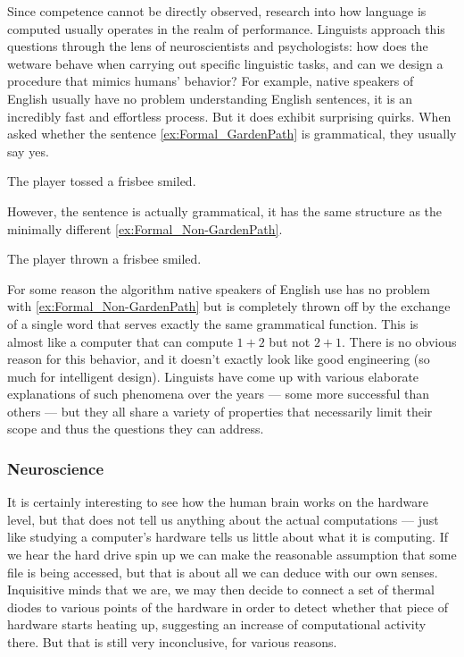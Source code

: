 Since competence cannot be directly observed, research into how language is computed usually operates in the realm of performance.
Linguists approach this questions through the lens of neuroscientists and psychologists: how does the wetware behave when carrying out specific linguistic tasks, and can we design a procedure that mimics humans' behavior?
For example, native speakers of English usually have no problem understanding English sentences, it is an incredibly fast and effortless process.
But it does exhibit surprising quirks.
When asked whether the sentence \eqref{ex:Formal_GardenPath} is grammatical, they usually say yes.
%
\begin{exe}
        \ex The player tossed a frisbee smiled.\label{ex:Formal_GardenPath}
\end{exe}
%
However, the sentence is actually grammatical, it has the same structure as the minimally different \eqref{ex:Formal_Non-GardenPath}. 
%
\begin{exe}
    \ex The player thrown a frisbee smiled.\label{ex:Formal_Non-GardenPath}
\end{exe}
%
For some reason the algorithm native speakers of English use has no problem with \eqref{ex:Formal_Non-GardenPath} but is completely thrown off by the exchange of a single word that serves exactly the same grammatical function.
This is almost like a computer that can compute $1 + 2$ but not $2 + 1$.
There is no obvious reason for this behavior, and it doesn't exactly look like good engineering (so much for intelligent design).
Linguists have come up with various elaborate explanations of such phenomena over the years --- some more successful than others ---
but they all share a variety of properties that necessarily limit their scope and thus the questions they can address.

\subsubsection{Neuroscience}

It is certainly interesting to see how the human brain works on the hardware level, but that does not tell us anything about the actual computations --- just like studying a computer's hardware tells us little about what it is computing.
If we hear the hard drive spin up we can make the reasonable assumption that some file is being accessed, but that is about all we can deduce with our own senses.
Inquisitive minds that we are, we may then decide to connect a set of thermal diodes to various points of the hardware in order to detect whether that piece of hardware starts heating up, suggesting an increase of computational activity there.
But that is still very inconclusive, for various reasons.

